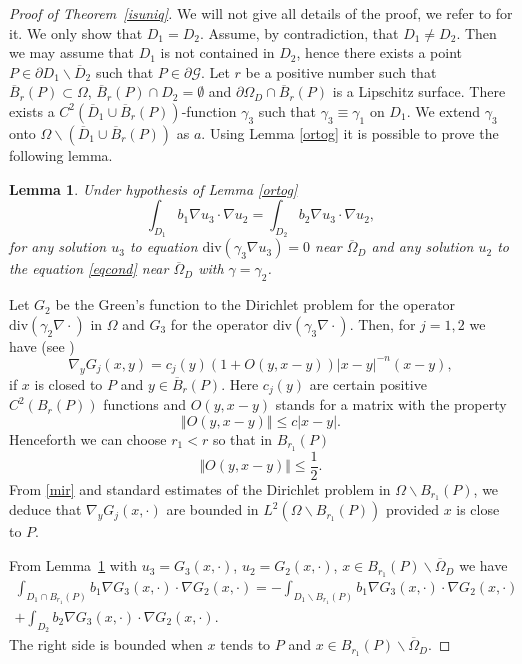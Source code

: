\documentclass[10pt, a4paper, twoside, openright]{book}
\theoremstyle{definition}
\theoremstyle{plain}
\theoremstyle{plain}
\theoremstyle{plain}
\theoremstyle{plain}
\theoremstyle{plain}
\newtheorem{lemma}[subsection]{Lemma}
\theoremstyle{plain}
\theoremstyle{plain}
\theoremstyle{plain}
\begin{document}
\begin{proof}[Proof of Theorem~\ref{isuniq}]
We will not give all details of the proof,
we refer to \cite{Is88, Is98} for it.
We  only show that $D_1=D_2$.
Assume, by contradiction, that $D_1\neq D_2$.
Then we may assume that $D_1$ is not contained in $D_2$,
hence there exists a point $P\in\partial D_1\backslash\overline{D}_2$
such that $P\in\partial\mathcal{G}$.
Let $r$ be a positive number such that
$\overline{B}_r(P)\subset\Omega$,
$\overline{B}_r(P)\cap D_2=\emptyset$ and $\partial\Omega_D\cap\overline{B}_r(P)$
is a Lipschitz surface.
There exists a $C^2(\overline{D}_1\cup\overline{B}_r(P))$-function
$\gamma_3$ such that $\gamma_3\equiv\gamma_1$ on $D_1$.
We extend $\gamma_3$ onto
$\Omega\backslash(\overline{D}_1\cup\overline{B}_r(P))$ as $a$.
Using Lemma \ref{ortog} it is possible to prove the following lemma.
\begin{lemma}
\label{ortog2}
Under hypothesis of Lemma \ref{ortog}
\begin{equation}
\int_{D_1}b_1\nabla u_3\cdot\nabla u_2
=\int_{D_2}b_2\nabla u_3\cdot\nabla u_2,
\end{equation}
for any solution $u_3$ to equation $\mathrm{div}(\gamma_3\nabla u_3)=0$
near $\overline{\Omega}_D$ and any solution $u_2$
to the equation \eqref{eqcond} near $\overline{\Omega}_D$ with $\gamma=\gamma_2$.
\end{lemma}
Let $G_2$ be the Green's function to the Dirichlet problem for the
operator $\mathrm{div}(\gamma_2\nabla\cdot)$
in $\Omega$ and $G_3$ for the operator
$\mathrm{div}(\gamma_3\nabla\cdot)$. Then, for $j=1,2$ we have
(see \cite{miranda:book})
\begin{equation}
\label{mir}
\nabla_y G_j(x,y)=c_j(y)\left(1+O(y,x-y)\right)|x-y|^{-n}(x-y),
\end{equation}
if $x$ is closed to $P$ and $y\in\overline B_r(P)$.
Here $c_j(y)$ are certain positive $C^2(B_r(P))$ functions
and $O(y,x-y)$ stands for a matrix with the property
$$\Vert O(y,x-y)\Vert\leq c|x-y|.$$
Henceforth we can choose $r_1<r$ so that in $B_{r_1}(P)$
$$\Vert O(y,x-y)\Vert\leq\frac{1}{2}.$$
From \eqref{mir} and standard estimates of the Dirichlet problem in
$\Omega\backslash B_{r_1}(P)$, we deduce that
$\nabla_y G_j(x,\cdot)$ are bounded in $L^2(\Omega\backslash B_{r_1}(P))$
provided $x$ is close to $P$.

From Lemma~\ref{ortog2} with $u_3=G_3(x,\cdot)$, $u_2=G_2(x,\cdot)$,
$x\in B_{r_1}(P)\backslash\overline\Omega_D$ we have
\begin{multline*}
\int_{D_1\cap B_{r_1}(P)}b_1\nabla G_3(x,\cdot)\cdot\nabla G_2(x,\cdot)=
-\int_{D_1\backslash B_{r_1}(P)}b_1\nabla G_3(x,\cdot)\cdot\nabla G_2(x,\cdot)\\
+\int_{D_2}b_2\nabla G_3(x,\cdot)\cdot\nabla G_2(x,\cdot).
\end{multline*}
The right side is bounded when $x$ tends to $P$ and
$x\in B_{r_1}(P)\backslash\overline\Omega_D$.


\end{proof}
\end{document}
